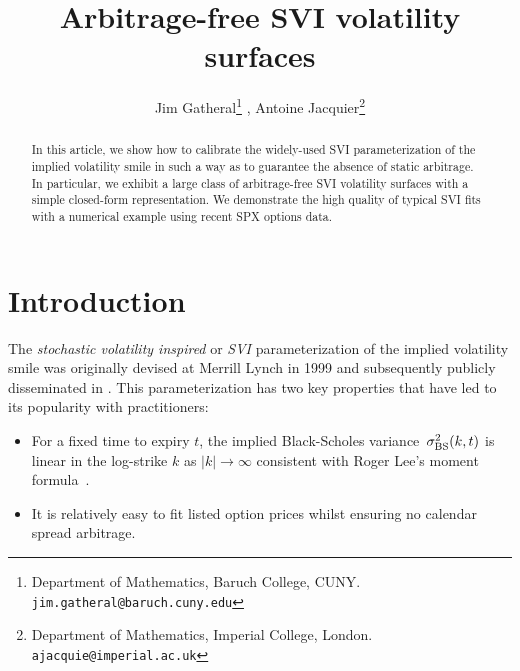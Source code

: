 \documentclass[12pt]{article}
\numberwithin{equation}{section}
\newcommand{\BS}{\rm BS}
\begin{document}
\title{\bf Arbitrage-free SVI volatility surfaces}

\author{Jim Gatheral\footnote{Department of Mathematics, Baruch College, CUNY. {\tt  jim.gatheral@baruch.cuny.edu}}{\setcounter{footnote}{1}} , Antoine Jacquier\footnote{Department of Mathematics, Imperial College, London. {\tt  ajacquie@imperial.ac.uk}}{\setcounter{footnote}{2}} }


\maketitle\thispagestyle{empty}


\begin{abstract}


In this article, we show how to calibrate the widely-used SVI parameterization of the implied volatility smile in such a way as to guarantee the absence of static arbitrage.  
In particular, we exhibit a large class of arbitrage-free SVI volatility surfaces with a simple closed-form representation.  
We demonstrate the high quality of typical SVI fits with a numerical example using recent SPX options data.
\end{abstract}

%
%
%
%

\section{Introduction}

The {\em stochastic volatility inspired} or {\em SVI} parameterization of the implied volatility smile was originally devised at Merrill Lynch in 1999 and subsequently publicly disseminated in \cite{Gatheral:2004}.  This parameterization has two key properties that have led to its popularity with practitioners:
\begin{itemize}
\item{For a fixed time to expiry $t$, the implied Black-Scholes variance~$\sigma_{\BS}^2(k,t)$ is linear in the log-strike $k$ as $|k| \to \infty$ consistent with Roger Lee's moment formula~\cite{RogerLee}.}
\item{It is relatively easy to fit listed option prices whilst ensuring no calendar spread arbitrage.}
\end{itemize}
\end{document}
